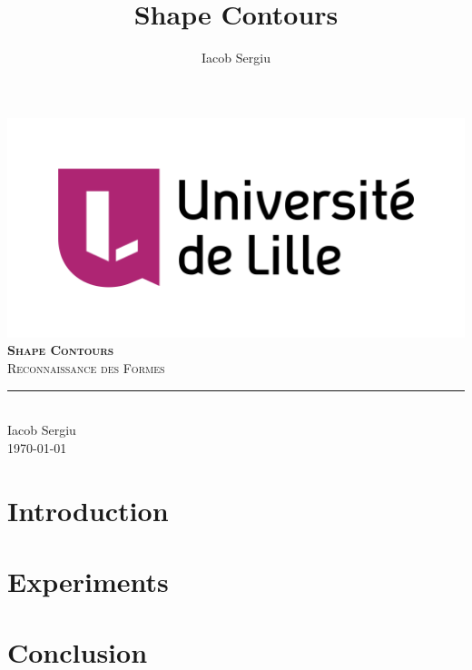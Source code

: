 \documentclass[11pt,titlepage]{report}
\author{Iacob Sergiu}
\title{Shape Contours}
\begin{document}
\begin{titlepage}
	\centering
    \includegraphics[width=0.75\linewidth]{images/universite_de_lille.png}\\[0.25cm] 	%
    \vspace{\fill}
    \textbf{\textsc{\fontsize{50}{50}\selectfont Shape Contours}}\\ \vspace{\fill}		
	\textsc{\LARGE Reconnaissance des Formes}\\[0.4cm]
	\rule{\linewidth}{0.2 mm} \\[0.5 cm]
    Iacob Sergiu \\[2cm]
	\today
\end{titlepage}
\restoregeometry

\tableofcontents

\chapter{Introduction}


\chapter{Experiments}


\chapter{Conclusion}


\clearpage
\pagestyle{numberonly}

\printbibliography
\end{document}
